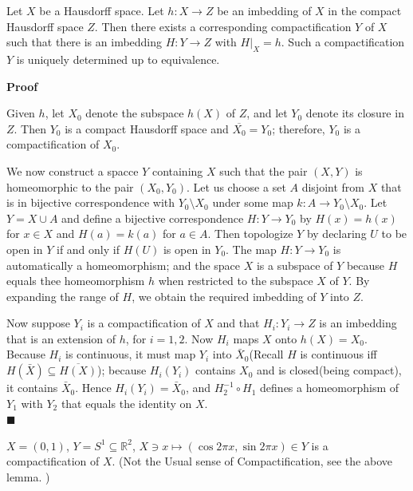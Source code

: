 \documentclass[main.tex]{subfiles}
\begin{document}
\begin{lemma}\label{lemma:CRImbed}
    Let $X$ be a Hausdorff space. Let $h: X \to Z$ be an imbedding of $X$ in the compact Hausdorff space $Z$. Then there exists a corresponding compactification $Y$ of $X$ such that there is an imbedding $H: Y \to Z$ with $H|_{X} = h$. Such a compactification $Y$ is uniquely determined up to equivalence. 
\end{lemma}
\par \noindent \textbf{Proof} 
\par Given $h$, let $X_0$ denote the subspace $h(X)$ of $Z$, and let $Y_0$ denote its closure in $Z$. Then $Y_0$ is a compact Hausdorff space and $\overline{X_0} = Y_0$; therefore, $Y_0$ is a compactification of $X_0$. 
\par We now construct a spacce $Y$ containing $X$ such that the pair $(X, Y)$ is homeomorphic to the pair $(X_0, Y_0)$. Let us choose a set $A$ disjoint from $X$ that is in bijective correspondence with $Y_0 \setminus X_0$ under some map $k: A \rightarrow Y_0 \setminus X_0$. Let $Y = X \cup A$ and define a bijective correspondence $H: Y \to Y_0$ by $H(x) = h(x)$ for $x \in X$ and $H(a) = k(a)$ for $a \in A$. Then topologize $Y$ by declaring $U$ to be open in $Y$ if and only if $H(U)$ is open in $Y_0$. The map $H: Y \to Y_0$ is automatically a homeomorphism; and the space $X$ is a subspace of $Y$ because $H$ equals thee homeomorphism $h$ when restricted to the subspace $X$ of $Y$. By expanding the range of $H$, we obtain the required imbedding of $Y$ into $Z$. 
\par Now suppose $Y_i$ is a compactification of $X$ and that $H_i: Y_i \to Z$ is an imbedding that is an extension of $h$, for $i = 1, 2$. Now $H_i$ maps $X$ onto $h(X) = X_0$. Because $H_i$ is continuous, it must map $Y_i$ into $\bar{X}_0$(Recall $H$ is continuous iff $H(\bar{X}) \subseteq \overline{H(X)}$); because $H_i(Y_i)$ contains $X_0$ and is closed(being compact), it contains $\bar{X}_0$. Hence $H_i(Y_i) = \bar{X}_0$, and $H_2^{-1} \circ H_1$ defines a homeomorphism of $Y_1$ with $Y_2$ that equals the identity on $X$. 
\mbox{} \\ \null \hfill $\blacksquare$ 

\begin{example}
    $X = (0, 1)$, $Y = S^1 \subseteq \mathbb{R}^2$, $X\ni x \mapsto (\cos 2\pi x, \sin 2\pi x) \in Y$ is a compactification of $X$. (Not the Usual sense of Compactification, see the above lemma. )
\end{example}
\end{document}
